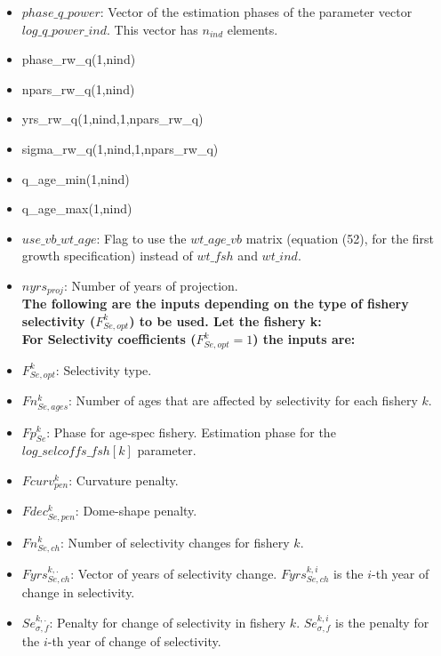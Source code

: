 \documentclass{article}
\begin{document}
\begin{itemize}
     \item $phase\_q\_power$: Vector of the estimation phases of the parameter vector $log\_q\_power\_ind$. This vector  has $n_{ind}$ elements.
    \item phase\_rw\_q(1,nind)
    \item npars\_rw\_q(1,nind)
    \item yrs\_rw\_q(1,nind,1,npars\_rw\_q)
    \item sigma\_rw\_q(1,nind,1,npars\_rw\_q)
    \item q\_age\_min(1,nind)
    \item q\_age\_max(1,nind) 
    \item $use\_vb\_wt\_age$: Flag to use the $wt\_age\_vb$ matrix (equation (52), for the first growth specification) instead of $wt\_fsh$ and $wt\_ind$.
    \item $nyrs_{proj}$: Number of years of projection.\\
    
    \textbf{The following are the inputs depending on the type of fishery selectivity ($F^k_{Se,opt}$) to be used. Let the fishery k: }\\
    
    \textbf{For Selectivity coefficients ($F^k_{Se,opt}=1$) the inputs are:}\\
    
    \item $F^k_{Se,opt}$: Selectivity type.
    \item $Fn_{Se,ages}^k$: Number of ages that are affected by selectivity for each fishery $k$.
    \item $Fp_{Se}^k$: Phase for age-spec fishery. Estimation phase for the $log\_selcoffs\_fsh[k]$ parameter.
    \item $Fcurv_{pen}^k$: Curvature penalty.
    \item $Fdec_{Se,pen}^k$: Dome-shape penalty.
    \item $Fn_{Se,ch}^k$: Number of selectivity changes for fishery $k$.
    \item $Fyrs_{Se,ch}^{k, .}$: Vector of years of selectivity change. $Fyrs_{Se,ch}^{k,i}$ is the $i$-th year of change in selectivity. 
    \item $Se_{\sigma,f}^{k,.}$: Penalty for change of selectivity in fishery $k$.  $Se_{\sigma,f}^{k,i}$ is the penalty for the $i$-th year of change of selectivity.
    

\end{itemize}
\end{document}
